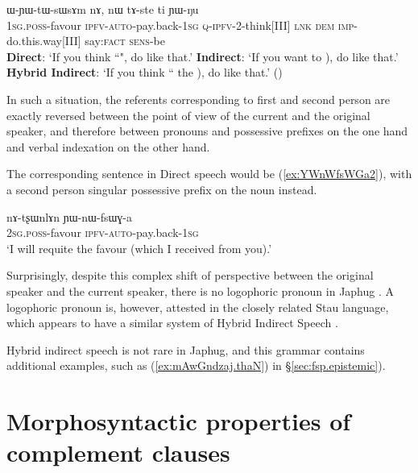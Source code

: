  \begin{exe}
 \ex \label{ex:YWnWfsWGa}
\gll  {}  ɯ-ɲɯ-tɯ-sɯsɤm nɤ, nɯ tɤ-ste ti ɲɯ-ŋu \\
  {\textsc{1sg}.\textsc{poss}-favour} {\textsc{ipfv}-\textsc{auto}-pay.back-\textsc{1sg}} \textsc{q}-\textsc{ipfv}-2-think[III] \textsc{lnk} \textsc{dem} \textsc{imp}-do.this.way[III] say:\textsc{fact} \textsc{sens}-be \\
\glt    \textbf{Direct}: `If you think ``", do like that.'
\glt    \textbf{Indirect}: `If you want to ), do like that.'
\glt   \textbf{Hybrid Indirect}: `If you think `` the ), do like that.'
()
\end{exe}

In such a situation, the referents corresponding to first and second person are exactly reversed between the point of view of the current and the original speaker, and therefore between pronouns and possessive prefixes on the one hand and verbal indexation on the other hand.
   
The corresponding sentence in Direct speech would be (\ref{ex:YWnWfsWGa2}), with a second person singular possessive prefix on the noun   instead.

\begin{exe}
\ex \label{ex:YWnWfsWGa2}
\gll nɤ-tʂɯnlɤn ɲɯ-nɯ-fsɯɣ-a \\
  {\textsc{2sg}.\textsc{poss}-favour} {\textsc{ipfv}-\textsc{auto}-pay.back-\textsc{1sg}} \\ 
 \glt `I will requite the favour (which I received from you).'
\end{exe}


Surprisingly, despite this complex shift of perspective between the original speaker and the current speaker, there is no logophoric pronoun in Japhug \citep{hagege74logophoriques, nikitina12logophoric}. A logophoric pronoun is, however, attested in the closely related Stau language, which appears to have a similar system of Hybrid Indirect Speech \citep{jacques17stau}.

Hybrid indirect speech is not rare in Japhug, and this grammar contains additional examples, such as  (\ref{ex:mAwGndzaj.thaN}) in §\ref{sec:fsp.epistemic}).



\section{Morphosyntactic properties of complement clauses}  \label{sec:complement.morphosyntax}
